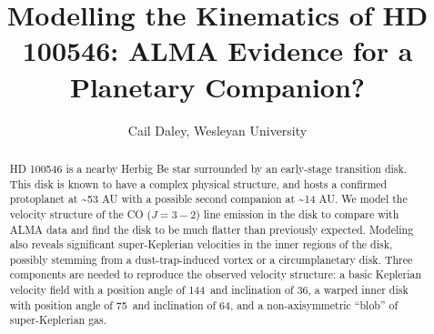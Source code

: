 \documentclass{knac}
\begin{document}
\title{Modelling the Kinematics of HD 100546: ALMA Evidence for a Planetary Companion?}


\author{Cail Daley, Wesleyan University}



\begin{abstract}
  HD 100546 is a nearby Herbig Be star surrounded by an early-stage transition disk. This disk is known to have a complex physical structure, and hosts a confirmed protoplanet at \textasciitilde 53 AU with a possible second companion at \textasciitilde 14 AU. We model the velocity structure of the CO ($J=3-2$) line emission in the disk to compare with ALMA data and find the disk to be much flatter than previously expected. Modeling also reveals significant super-Keplerian velocities in the inner regions of the disk, possibly stemming from a dust-trap-induced vortex or a circumplanetary disk. Three components are needed to reproduce the observed velocity structure: a basic Keplerian velocity field with a position angle of 144\textdegree \ and inclination of 36\textdegree, a warped inner disk with position angle of 75\textdegree \ and inclination of 64\textdegree, and a non-axisymmetric ``blob'' of super-Keplerian gas.

\end{abstract}

\end{document}
